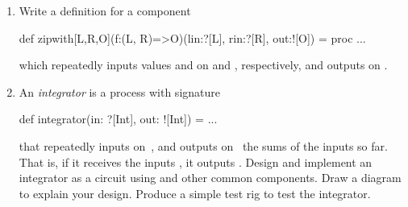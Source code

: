 \begin{nontutequestion}
\Programming
\begin{enumerate}
\item
Write a definition for a component
%
\begin{scala}
def zipwith[L,R,O](f:(L, R)=>O)(lin:?[L], rin:?[R], out:![O]) = proc{ ... }
\end{scala}
%
which repeatedly inputs values  and  on  and
, respectively, and outputs  on . 

\item
An \emph{integrator} is a process with signature
%
\begin{scala}
def integrator(in: ?[Int], out: ![Int]) = ...
\end{scala}
that repeatedly inputs on~, and outputs on~ the sums of
the inputs so far.  That is, if it receives the inputs , it outputs .  Design and implement an
integrator as a circuit using  and other common components.
Draw a diagram to explain your design.  Produce a simple test rig to test the
integrator. 
\end{enumerate}
\end{nontutequestion}


